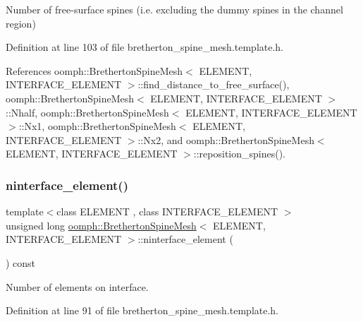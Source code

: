 Number of free-\/surface spines (i.\+e. excluding the dummy spines in the channel region) 

Definition at line 103 of file bretherton\+\_\+spine\+\_\+mesh.\+template.\+h.



References oomph\+::\+Bretherton\+Spine\+Mesh$<$ E\+L\+E\+M\+E\+N\+T, I\+N\+T\+E\+R\+F\+A\+C\+E\+\_\+\+E\+L\+E\+M\+E\+N\+T $>$\+::find\+\_\+distance\+\_\+to\+\_\+free\+\_\+surface(), oomph\+::\+Bretherton\+Spine\+Mesh$<$ E\+L\+E\+M\+E\+N\+T, I\+N\+T\+E\+R\+F\+A\+C\+E\+\_\+\+E\+L\+E\+M\+E\+N\+T $>$\+::\+Nhalf, oomph\+::\+Bretherton\+Spine\+Mesh$<$ E\+L\+E\+M\+E\+N\+T, I\+N\+T\+E\+R\+F\+A\+C\+E\+\_\+\+E\+L\+E\+M\+E\+N\+T $>$\+::\+Nx1, oomph\+::\+Bretherton\+Spine\+Mesh$<$ E\+L\+E\+M\+E\+N\+T, I\+N\+T\+E\+R\+F\+A\+C\+E\+\_\+\+E\+L\+E\+M\+E\+N\+T $>$\+::\+Nx2, and oomph\+::\+Bretherton\+Spine\+Mesh$<$ E\+L\+E\+M\+E\+N\+T, I\+N\+T\+E\+R\+F\+A\+C\+E\+\_\+\+E\+L\+E\+M\+E\+N\+T $>$\+::reposition\+\_\+spines().

\mbox{\label{classoomph_1_1BrethertonSpineMesh_ae1ecd7c00fe1032e1ee16d7a98156d5c}} 
\subsubsection{\texorpdfstring{ninterface\+\_\+element()}{ninterface\_element()}}
{\footnotesize\ttfamily template$<$class E\+L\+E\+M\+E\+NT , class I\+N\+T\+E\+R\+F\+A\+C\+E\+\_\+\+E\+L\+E\+M\+E\+NT $>$ \\
unsigned long \hyperlink{classoomph_1_1BrethertonSpineMesh}{oomph\+::\+Bretherton\+Spine\+Mesh}$<$ E\+L\+E\+M\+E\+NT, I\+N\+T\+E\+R\+F\+A\+C\+E\+\_\+\+E\+L\+E\+M\+E\+NT $>$\+::ninterface\+\_\+element (\begin{DoxyParamCaption}{ }\end{DoxyParamCaption}) const\hspace{0.3cm}{\ttfamily [inline]}}



Number of elements on interface. 



Definition at line 91 of file bretherton\+\_\+spine\+\_\+mesh.\+template.\+h.



